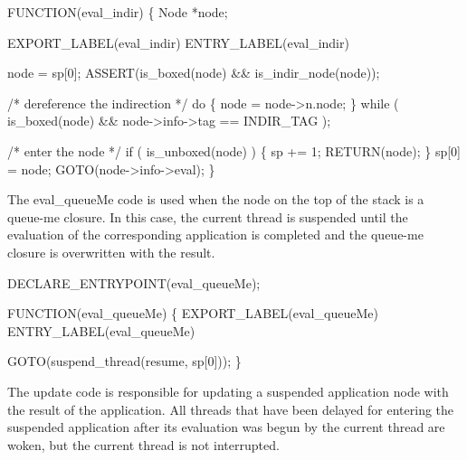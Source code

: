 \nwendcode{}\nwdocspar
\nwenddocs{}\plusendmoddef\nwstartdeflinemarkup{}\nwenddeflinemarkup
FUNCTION(eval_indir)
\{
    Node *node;

    EXPORT_LABEL(eval_indir)
 ENTRY_LABEL(eval_indir)

    node = sp[0];
    ASSERT(is_boxed(node) && is_indir_node(node));

    /* dereference the indirection */
    do
    \{
        node = node->n.node;
    \}
    while ( is_boxed(node) && node->info->tag == INDIR_TAG );

    /* enter the node */
    if ( is_unboxed(node) )
    \{
        sp += 1;
        RETURN(node);
    \}
    sp[0] = node;
    GOTO(node->info->eval);
\}

\nwendcode{}\nwdocspar
The {\Tt{}eval{\_}queueMe\nwendquote} code is used when the node on the top of the
stack is a queue-me closure. In this case, the current thread is
suspended until the evaluation of the corresponding application is
completed and the queue-me closure is overwritten with the result.

\nwenddocs{}\plusendmoddef\nwstartdeflinemarkup{}\nwenddeflinemarkup
DECLARE_ENTRYPOINT(eval_queueMe);

\nwendcode{}\nwdocspar
\nwenddocs{}\plusendmoddef\nwstartdeflinemarkup{}\nwenddeflinemarkup
FUNCTION(eval_queueMe)
\{
    EXPORT_LABEL(eval_queueMe)
 ENTRY_LABEL(eval_queueMe)

    GOTO(suspend_thread(resume, sp[0]));
\}

\nwendcode{}\nwdocspar
The {\Tt{}update\nwendquote} code is responsible for updating a suspended application
node with the result of the application. All threads that have been
delayed for entering the suspended application after its evaluation
was begun by the current thread are woken, but the current thread is
not interrupted.

